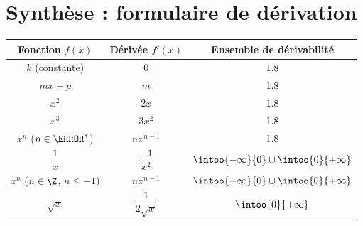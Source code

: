 \newpage

\section{Synthèse : formulaire de dérivation}

\begin{propriete}
	\nline
	\begin{center}
		\begin{tabular}{|c|c|c|} \hline
			\ccg\textbf{Fonction $f(x)$}         & \ccg\textbf{Dérivée $f'(x)$} & \ccg\textbf{Ensemble de dérivabilité}      \\ \hline
			$k$ (constante)                      & $0$                          & $1.8$                                       \\ \hline
			$mx + p$                             & $m$                          & $1.8$                                       \\ \hline
			$x^2$                                & $2x$                         & $1.8$                                       \\ \hline
			$x^3$                                & $3x^2$                       & $1.8$                                       \\ \hline
			$x^n$ ($n \in \N^*$)                 & $nx^{n-1}$                   & $1.8$                                       \\ \hline
			\rule[-4mm]{0mm}{11mm}$\dfrac{1}{x}$ & $\dfrac{-1}{x^2}$            & $\intoo{-\infty}{0}\cup\intoo{0}{+\infty}$ \\ \hline
			$x^n$ ($n \in \Z$, $n \leq -1$)      & $nx^{n-1}$                   & $\intoo{-\infty}{0}\cup\intoo{0}{+\infty}$ \\ \hline
			\rule[-4mm]{0mm}{11mm}$\sqrt{x}$     & $\dfrac{1}{2\sqrt{x}}$       & $\intoo{0}{+\infty}$                       \\ \hline
		\end{tabular}
	\end{center}
\end{propriete}

